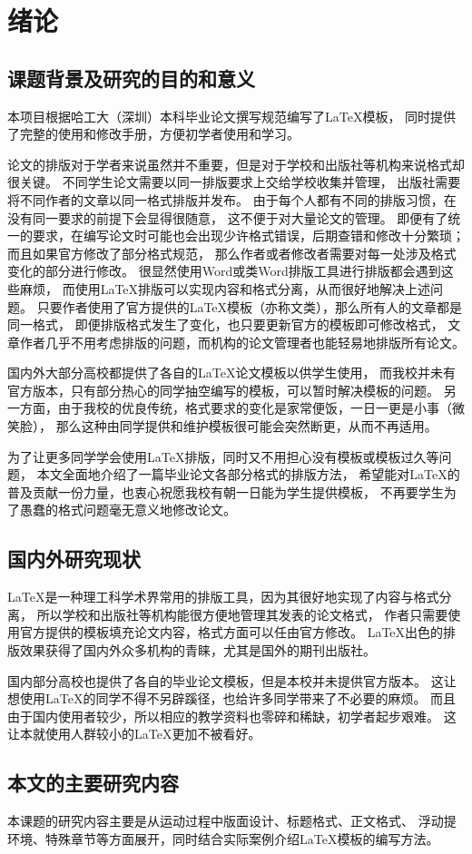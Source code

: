 \chapter{绪论}

\section{课题背景及研究的目的和意义}
本项目根据哈工大（深圳）本科毕业论文撰写规范编写了\LaTeX 模板，
同时提供了完整的使用和修改手册，方便初学者使用和学习。

论文的排版对于学者来说虽然并不重要，但是对于学校和出版社等机构来说格式却很关键。
不同学生论文需要以同一排版要求上交给学校收集并管理，
出版社需要将不同作者的文章以同一格式排版并发布。
由于每个人都有不同的排版习惯，在没有同一要求的前提下会显得很随意，
这不便于对大量论文的管理。
即便有了统一的要求，在编写论文时可能也会出现少许格式错误，后期查错和修改十分繁琐；
而且如果官方修改了部分格式规范，
那么作者或者修改者需要对每一处涉及格式变化的部分进行修改。
很显然使用Word或类Word排版工具进行排版都会遇到这些麻烦，
而使用\LaTeX 排版可以实现内容和格式分离，从而很好地解决上述问题。
只要作者使用了官方提供的\LaTeX 模板（亦称文类），那么所有人的文章都是同一格式，
即便排版格式发生了变化，也只要更新官方的模板即可修改格式，
文章作者几乎不用考虑排版的问题，而机构的论文管理者也能轻易地排版所有论文。

国内外大部分高校都提供了各自的\LaTeX 论文模板以供学生使用，
而我校并未有官方版本，只有部分热心的同学抽空编写的模板，可以暂时解决模板的问题。
另一方面，由于我校的优良传统，格式要求的变化是家常便饭，一日一更是小事（微笑脸），
那么这种由同学提供和维护模板很可能会突然断更，从而不再适用。

为了让更多同学学会使用\LaTeX 排版，同时又不用担心没有模板或模板过久等问题，
本文全面地介绍了一篇毕业论文各部分格式的排版方法，
希望能对\LaTeX 的普及贡献一份力量，也衷心祝愿我校有朝一日能为学生提供模板，
不再要学生为了愚蠢的格式问题毫无意义地修改论文。


\section{国内外研究现状}
\LaTeX 是一种理工科学术界常用的排版工具，因为其很好地实现了内容与格式分离，
所以学校和出版社等机构能很方便地管理其发表的论文格式，
作者只需要使用官方提供的模板填充论文内容，格式方面可以任由官方修改。
\LaTeX 出色的排版效果获得了国内外众多机构的青睐，尤其是国外的期刊出版社。

国内部分高校也提供了各自的毕业论文模板，但是本校并未提供官方版本。
这让想使用\LaTeX 的同学不得不另辟蹊径，也给许多同学带来了不必要的麻烦。
而且由于国内使用者较少，所以相应的教学资料也零碎和稀缺，初学者起步艰难。
这让本就使用人群较小的\LaTeX 更加不被看好。


\section{本文的主要研究内容}
本课题的研究内容主要是从运动过程中版面设计、标题格式、正文格式、
浮动提环境、特殊章节等方面展开，同时结合实际案例介绍\LaTeX 模板的编写方法。

